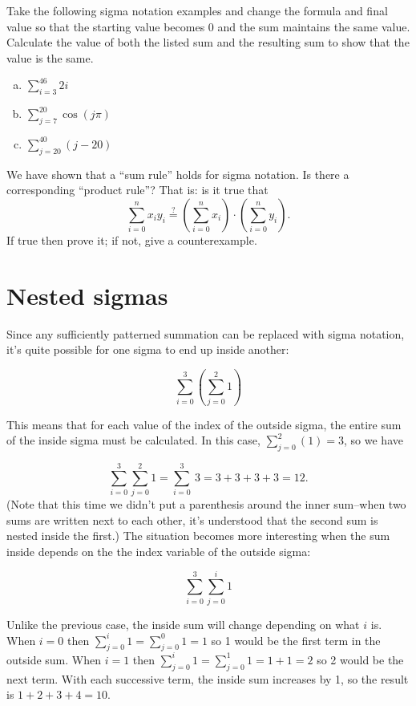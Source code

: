 \begin {exercise}{}
Take the following sigma notation examples and change the formula and final value so that the starting value becomes 0 and the sum maintains the same value.  Calculate the value of both the listed sum and the resulting sum to show that the value is the same.
\begin {enumerate} [(a)]
 \item
$\displaystyle{\sum_{i=3}^{46}2i}$
\item
$\displaystyle{\sum_{j=7}^{20}\cos(j\pi )}$
\item
$\displaystyle{\sum_{j=20}^{40}(j-20)}$
\end {enumerate}
\end{exercise}

\begin {exercise}{}
We have shown that a ``sum rule'' holds for sigma notation.  Is there a corresponding ``product rule''? That is: is it true that
\[ \sum_{i=0}^n x_i y_i \stackrel{?}{=} \left(\sum_{i=0}^n x_i \right) \cdot  \left(  \sum_{i=0}^n y_i \right). \]
If true then prove it; if not, give a counterexample.
\end{exercise}


\section{Nested sigmas\quad
{}}
Since any  sufficiently patterned summation can be replaced with sigma notation, it's quite possible for one sigma to end up inside another:

\[\sum_{i=0}^{3}\left( \sum_{j=0}^{2}1\right)\]

This means that for each value of the index of the outside sigma, the entire sum of the inside sigma must be calculated.  In this case, $\sum_{j=0}^{2}(1)=3$, so we have

\[\sum_{i=0}^{3}\sum_{j=0}^{2}1 =  \sum_{i=0}^{3}\ 3  = 3+3+3+3 = 12. \]
(Note that this time we didn't put a parenthesis around the inner sum--when two sums are written next to each other, it's understood that the second sum is nested inside the first.)
The situation becomes more interesting when the sum inside depends on the the index variable of the outside sigma:

\[\sum_{i=0}^{3}\sum_{j=0}^{i}1\]

Unlike the previous case, the inside sum will change depending on what $i$ is.  When $i=0$ then $\sum_{j=0}^{i}1=\sum_{j=0}^{0}1=1$ so 1 would be the first term in the outside sum.  When $i=1$ then $\sum_{j=0}^{i}1=\sum_{j=0}^{1}1=1+1=2$ so 2 would be the next term.  With each successive term, the inside sum increases by 1, so the result is $1+2+3+4 = 10$.

